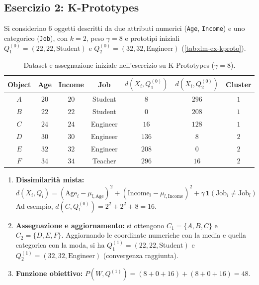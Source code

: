\subsection{Esercizio 2: K-Prototypes}
\label{sec:dm-ex-kprototypes}

Si considerino $6$ oggetti descritti da due attributi numerici (\texttt{Age}, \texttt{Income}) e uno categorico (\texttt{Job}), con $k = 2$, peso $\gamma = 8$ e prototipi iniziali $Q_1^{(0)} = (22, 22, \text{Student})$ e $Q_2^{(0)} = (32, 32, \text{Engineer})$ (\autoref{tab:dm-ex-kproto}).

\begin{table}[H]
\centering
\caption{Dataset e assegnazione iniziale nell'esercizio su K-Prototypes ($\gamma = 8$).}
\label{tab:dm-ex-kproto}
\small
\begin{tabular}{ccccccc}
\toprule
\textbf{Object} & \textbf{Age} & \textbf{Income} & \textbf{Job} & $d(X_i, Q_1^{(0)})$ & $d(X_i, Q_2^{(0)})$ & \textbf{Cluster} \\
\midrule
$A$ & $20$ & $20$ & Student  & $8$   & $296$ & $1$ \\
$B$ & $22$ & $22$ & Student  & $0$   & $208$ & $1$ \\
$C$ & $24$ & $24$ & Engineer & $16$  & $128$ & $1$ \\
$D$ & $30$ & $30$ & Engineer & $136$ & $8$   & $2$ \\
$E$ & $32$ & $32$ & Engineer & $208$ & $0$   & $2$ \\
$F$ & $34$ & $34$ & Teacher  & $296$ & $16$  & $2$ \\
\bottomrule
\end{tabular}
\end{table}

\begin{enumerate}
    \item \textbf{Dissimilarit\`a mista:}
    \begin{equation*}
        d(X_i, Q_l) = (\text{Age}_i - \mu_{l,\text{Age}})^2 + (\text{Income}_i - \mu_{l,\text{Income}})^2 + \gamma\,\mathbf{1}(\text{Job}_i \neq \text{Job}_l)
    \end{equation*}
    Ad esempio, $d(C, Q_1^{(0)}) = 2^2 + 2^2 + 8 = 16$.
    \item \textbf{Assegnazione e aggiornamento:} si ottengono $C_1 = \{A,B,C\}$ e $C_2 = \{D,E,F\}$. Aggiornando le coordinate numeriche con la media e quella categorica con la moda, si ha $Q_1^{(1)} = (22, 22, \text{Student})$ e $Q_2^{(1)} = (32, 32, \text{Engineer})$ (convergenza raggiunta).
    \item \textbf{Funzione obiettivo:} $P(W, Q^{(1)}) = (8 + 0 + 16) + (8 + 0 + 16) = 48$.
\end{enumerate}

